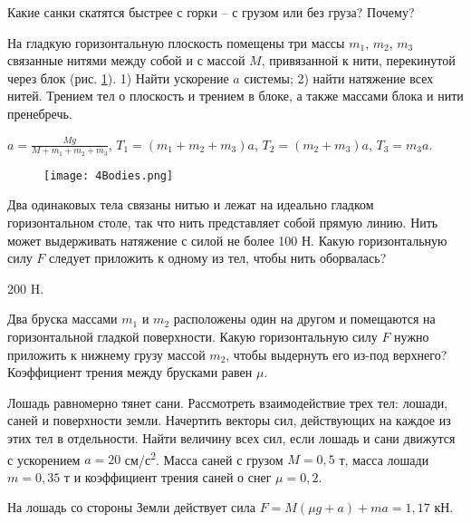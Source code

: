 \begin{ex} %
Какие санки скатятся быстрее с горки -- с грузом или без груза? Почему?
\end{ex}

\simpleProblems

\begin{ex} %
На гладкую горизонтальную плоскость помещены три массы $m_1$, $m_2$, $m_3$ связанные нитями между собой и с массой $M$, привязанной к нити, перекинутой через блок (рис. \ref{4Bodies}). 1) Найти ускорение $a$ системы; 2) найти натяжение всех нитей. Трением тел о плоскость и трением в блоке, а также массами блока и нити пренебречь.
\begin{ans}
$a = \frac{Mg}{M + m_1 +m_2 +m_3}$, $T_1 = (m_1 +m_2 +m_3)a$, $T_2 = (m_2 +m_3)a$, $T_3 = m_3 a$.
\end{ans}
\end{ex}

\begin{figure}[h]
\centering
\texttt{[image: 4Bodies.png]}
\caption{}
\label{4Bodies}
\end{figure}

\begin{ex} %
Два одинаковых тела связаны нитью и лежат на идеально гладком горизонтальном столе, так что нить представляет собой прямую линию. Нить может выдерживать натяжение с силой не более 100 Н. Какую горизонтальную силу $F$ следует приложить к одному из тел, чтобы нить оборвалась?
\begin{ans}
200 H.
\end{ans}
\end{ex}

\begin{ex}
Два бруска массами $m_1$ и $m_2$ расположены один на другом и помещаются на горизонтальной гладкой поверхности. Какую горизонтальную силу $F$ нужно приложить к нижнему грузу массой $m_2$, чтобы выдернуть его из-под верхнего? Коэффициент трения между брусками равен $\mu$.
\end{ex}

\begin{ex} %
Лошадь равномерно тянет сани. Рассмотреть взаимодействие трех тел: лошади, саней и поверхности земли. Начертить векторы сил, действующих на каждое из этих тел в отдельности. Найти величину всех сил, если лошадь и сани движутся с ускорением $a = 20$ см/с\textsuperscript{2}. Масса саней с грузом $M = 0,5$ т, масса лошади $m = 0,35$ т и коэффициент трения саней о снег $\mu = 0,2$.
\begin{ans}
На лошадь со стороны Земли действует сила $F = M(\mu g + a) + ma = 1,17$ кН.
\end{ans}
\end{ex}

